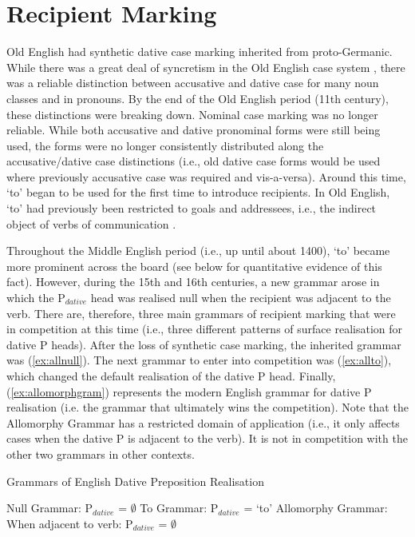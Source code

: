 \section{Recipient Marking}
	Old English had synthetic dative case marking inherited from proto-Germanic. While there was a great deal of syncretism in the Old English case system \citep{Allen.1999}, there was a reliable distinction between accusative and dative case for many noun classes and in pronouns. By the end of the Old English period (11th century), these distinctions were breaking down. Nominal case marking was no longer reliable. While both accusative and dative pronominal forms were still being used, the forms were no longer consistently distributed along the accusative/dative case distinctions (i.e., old dative case forms would be used where previously accusative case was required and vis-a-versa). Around this time, `to' began to be used for the first time to introduce recipients. In Old English, `to' had previously been restricted to goals and addressees, i.e., the indirect object of verbs of communication \citep{Allen.1999,McFadden.2002,OED.2013}. 

	Throughout the Middle English period (i.e., up until about 1400), `to' became more prominent across the board (see below for quantitative evidence of this fact). However, during the 15th and 16th centuries, a new grammar arose in which the P$_{dative}$ head was realised null when the recipient was adjacent to the verb. There are, therefore, three main grammars of recipient marking that were in competition at this time (i.e., three different patterns of surface realisation for dative P heads). After the loss of synthetic case marking, the inherited grammar was (\ref{ex:allnull}). The next grammar to enter into competition was (\ref{ex:allto}), which changed the default realisation of the dative P head. Finally, (\ref{ex:allomorphgram}) represents the modern English grammar for dative P realisation (i.e. the grammar that ultimately wins the competition). Note that the Allomorphy Grammar has a restricted domain of application (i.e., it only affects cases when the dative P is adjacent to the verb). It is not in competition with the other two grammars in other contexts.

	\begin{exe}
		\ex Grammars of English Dative Preposition Realisation
		\begin{xlist}
			\ex Null Grammar: P$_{dative}$ = $\emptyset$ \label{ex:allnull}
			\ex To Grammar: P$_{dative}$ = `to' \label{ex:allto}
			\ex Allomorphy Grammar: When adjacent to verb: P$_{dative}$ = $\emptyset$\label{ex:allomorphgram}
		\end{xlist}
	\end{exe}

